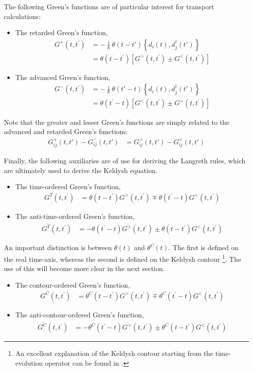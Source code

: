 The following Green's functions are of particular interest for transport calculations: 
\begin{itemize}
\item The retarded Green's function, \begin{align*}
G^+(t,t^\prime) &=
-\frac{\imath}{\hbar} \theta(t-t') \left\{ d_i(t), d^\dagger_j(t')\right\}
\\ &=\theta(t-t^\prime) \left[ G^>(t,t^\prime) \pm G^<(t,t^\prime)\right]
\end{align*}
\item The advanced Green's function, \begin{align*}
G^-(t,t^\prime) &=
-\frac{\imath}{\hbar} \theta(t'-t) \left\{ d_i(t), d^\dagger_j(t')\right\}
\\ &= \theta(t^\prime-t) \left[ G^<(t,t^\prime) \pm G^>(t,t^\prime)\right]
\end{align*}
\end{itemize}
Note that the greater and lesser Green's functions are simply related to the advanced and retarded Green's functions:
\begin{align*}
G^+_{ij}(t,t') - G^-_{ij}(t,t') &= G^>_{ij}(t,t') - G^<_{ij}(t,t')
\end{align*}

Finally, the following auxiliaries are of use for deriving the Langreth rules, which are ultimately used to derive the Keldysh equation.
\begin{itemize}
\item The time-ordered Green's function, \begin{align*}
G^T(t,t^\prime) &= \theta(t-t^\prime) G^>(t,t^\prime)  \mp \theta(t^\prime-t)G^<(t,t^\prime) 
\end{align*}
\item The anti-time-ordered Green's function, \begin{align*}
G^{\tilde{T}}(t,t^\prime) &= - \theta(t^\prime-t) G^>(t,t^\prime)  \pm \theta(t-t^\prime)G^<(t,t^\prime) 
\end{align*} 
\end{itemize}

An important distinction is between $\theta (t)$ and $\theta^C(t)$. The first is defined on the real time-axis, whereas the second is defined on the Keldysh contour \footnote{An excellent explanation of the Keldysh contour starting from the time-evolution operator can be found in \citet{diventra}.}. The use of this will become more clear in the next section. 
\begin{itemize}
\item The contour-ordered Green's function, \begin{align*}
G^C(t,t^\prime) &= \theta^C(t-t^\prime) G^>(t,t^\prime)  \mp \theta^C(t^\prime-t)G^<(t,t^\prime) 
\end{align*}
\item The anti-contour-ordered Green's function, \begin{align*}
G^{\tilde{C}}(t,t^\prime) &= - \theta^C(t^\prime-t) G^>(t,t^\prime)  \pm \theta^C(t-t^\prime)G^<(t,t^\prime)
\end{align*} 
\end{itemize}


